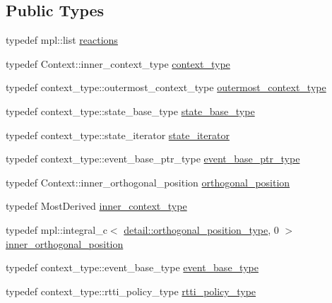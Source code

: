 \subsection*{Public Types}
\begin{DoxyCompactItemize}
\item 
typedef mpl\+::list \mbox{\hyperlink{classboost_1_1statechart_1_1simple__state_ad6e7750fede08000c7cf827dba68a85d}{reactions}}
\item 
typedef Context\+::inner\+\_\+context\+\_\+type \mbox{\hyperlink{classboost_1_1statechart_1_1simple__state_ac053eaa9e1b0e3ccbf2231786cd651c4}{context\+\_\+type}}
\item 
typedef context\+\_\+type\+::outermost\+\_\+context\+\_\+type \mbox{\hyperlink{classboost_1_1statechart_1_1simple__state_a25f32527ab9e99c9ae75c723e4be9cb6}{outermost\+\_\+context\+\_\+type}}
\item 
typedef context\+\_\+type\+::state\+\_\+base\+\_\+type \mbox{\hyperlink{classboost_1_1statechart_1_1simple__state_ae4af81f8eae996cc418efa3387af0ef6}{state\+\_\+base\+\_\+type}}
\item 
typedef context\+\_\+type\+::state\+\_\+iterator \mbox{\hyperlink{classboost_1_1statechart_1_1simple__state_a32d30bbceb41ad02b70016d8530722a1}{state\+\_\+iterator}}
\item 
typedef context\+\_\+type\+::event\+\_\+base\+\_\+ptr\+\_\+type \mbox{\hyperlink{classboost_1_1statechart_1_1simple__state_aeea28c41a57acb4507e30ca5adb6016f}{event\+\_\+base\+\_\+ptr\+\_\+type}}
\item 
typedef Context\+::inner\+\_\+orthogonal\+\_\+position \mbox{\hyperlink{classboost_1_1statechart_1_1simple__state_af97b00e4ff6f12a1045beb57687cf9bc}{orthogonal\+\_\+position}}
\item 
typedef Most\+Derived \mbox{\hyperlink{classboost_1_1statechart_1_1simple__state_a2474f5eb168d48615fa1db224653457a}{inner\+\_\+context\+\_\+type}}
\item 
typedef mpl\+::integral\+\_\+c$<$ \mbox{\hyperlink{namespaceboost_1_1statechart_1_1detail_a3bedea0b807a16fa222733417183d2c9}{detail\+::orthogonal\+\_\+position\+\_\+type}}, 0 $>$ \mbox{\hyperlink{classboost_1_1statechart_1_1simple__state_a8b829f6ba90355ad7ea32d9dcc7e09ad}{inner\+\_\+orthogonal\+\_\+position}}
\item 
typedef context\+\_\+type\+::event\+\_\+base\+\_\+type \mbox{\hyperlink{classboost_1_1statechart_1_1simple__state_a153e115715f5d828021a273ce282ba9b}{event\+\_\+base\+\_\+type}}
\item 
typedef context\+\_\+type\+::rtti\+\_\+policy\+\_\+type \mbox{\hyperlink{classboost_1_1statechart_1_1simple__state_a13264629f55d891a2f7e5ca247264216}{rtti\+\_\+policy\+\_\+type}}

\end{DoxyCompactItemize}
